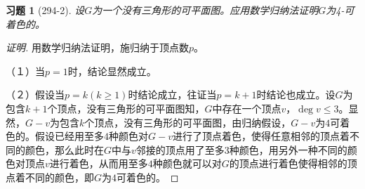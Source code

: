 \documentclass{article}
\begin{document}
\begin{CJK}{UTF8}{gbsn}
  \newtheorem*{Exercise}{习题}

\begin{Exercise}[294-2]
  设$G$为一个没有三角形的可平面图。应用数学归纳法证明$G$为4-可着色的。
\end{Exercise}
    \begin{proof}[证明]用数学归纳法证明，施归纳于顶点数$p$。

    （１）当$p=1$时，结论显然成立。

    （２）假设当$p=k(k\geq 1)$时结论成立，往证当$p=k+1$时结论也成立。设$G$为包含$k+1$个顶点，没有三角形的可平面图知，$G$中存在一个顶点$v$，$\deg v \leq 3$。显然，$G-v$为包含$k$个顶点，没有三角形的可平面图，由归纳假设，$G-v$为$4$可着色的。假设已经用至多$4$种颜色对$G-v$进行了顶点着色，使得任意相邻的顶点着不同的颜色，那么此时在$G$中与$v$邻接的顶点用了至多$3$种颜色，用另外一种不同的颜色对顶点$v$进行着色，从而用至多$4$种颜色就可以对$G$的顶点进行着色使得相邻的顶点着不同的颜色，即$G$为$4$可着色的。
    
  \end{proof}
\end{CJK}
\end{document}
